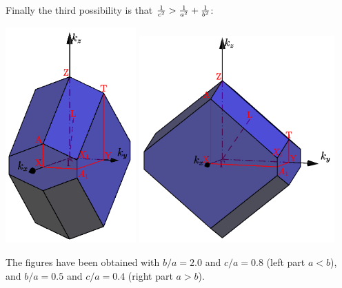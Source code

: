 \documentclass[12pt,a4paper]{article}
\begin{document}
Finally the third possibility is that 
${1\over c^2} >{1\over a^2} + {1\over b^2}$:
\begin{center}
\includegraphics[width=5.0cm,angle=0]{images/ofc_11.png} \hspace{1cm}
\includegraphics[width=7.5cm,angle=0]{images/ofc_12.png} 
\end{center}
The figures have been obtained with $b/a=2.0$ and $c/a=0.8$ (left part $a<b$),
and $b/a=0.5$ and $c/a=0.4$ (right part $a>b$).
\end{document}

